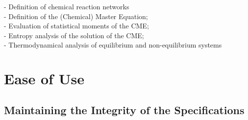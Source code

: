 \documentclass[conference]{IEEEtran}
\begin{document}
\noindent - Definition of chemical reaction networks\\
- Definition of the (Chemical) Master Equation;\\
- Evaluation of statistical moments of the CME;\\
- Entropy analysis of the solution of the CME;\\
- Thermodynamical analysis of equilibrium and non-equilibrium systems 

\section{Ease of Use}

\subsection{Maintaining the Integrity of the Specifications}

\cite{Gillespie,Gillespie2000}
\end{document}
